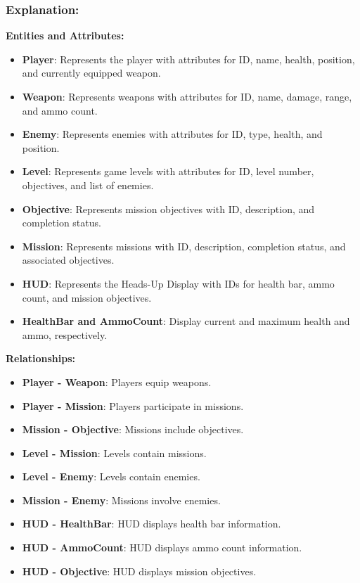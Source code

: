 \subsubsection{Explanation:}

\textbf{Entities and Attributes:}

\begin{itemize}
	\item \textbf{Player}: Represents the player with attributes for ID, name, health, position, and currently equipped weapon.
	\item \textbf{Weapon}: Represents weapons with attributes for ID, name, damage, range, and ammo count.
	\item \textbf{Enemy}: Represents enemies with attributes for ID, type, health, and position.
	\item \textbf{Level}: Represents game levels with attributes for ID, level number, objectives, and list of enemies.
	\item \textbf{Objective}: Represents mission objectives with ID, description, and completion status.
	\item \textbf{Mission}: Represents missions with ID, description, completion status, and associated objectives.
	\item \textbf{HUD}: Represents the Heads-Up Display with IDs for health bar, ammo count, and mission objectives.
	\item \textbf{HealthBar and AmmoCount}: Display current and maximum health and ammo, respectively.
\end{itemize}

\textbf{Relationships:}

\begin{itemize}
	\item \textbf{Player - Weapon}: Players equip weapons.
	\item \textbf{Player - Mission}: Players participate in missions.
	\item \textbf{Mission - Objective}: Missions include objectives.
	\item \textbf{Level - Mission}: Levels contain missions.
	\item \textbf{Level - Enemy}: Levels contain enemies.
	\item \textbf{Mission - Enemy}: Missions involve enemies.
	\item \textbf{HUD - HealthBar}: HUD displays health bar information.
	\item \textbf{HUD - AmmoCount}: HUD displays ammo count information.
	\item \textbf{HUD - Objective}: HUD displays mission objectives.
\end{itemize}

